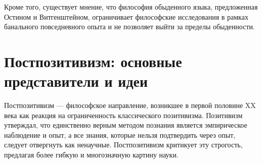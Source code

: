 \documentclass[12pt,a4paper]{article}
\begin{document}
	Кроме того, существует мнение, что философия обыденного языка, предложенная Остином и Витгенштейном, ограничивает философские исследования в рамках банального повседневного опыта и не позволяет выйти за пределы обыденности.
	
	\section{Постпозитивизм: основные представители и идеи~\checkmark}
	Постпозитивизм — философское направление, возникшее в первой половине XX века как реакция на ограниченность классического позитивизма. Позитивизм утверждал, что единственно верным методом познания является эмпирическое наблюдение и опыт, а все знания, которые нельзя подтвердить через опыт, следует отвергнуть как ненаучные. Постпозитивизм критикует эту строгость, предлагая более гибкую и многозначную картину науки.
\end{document}
